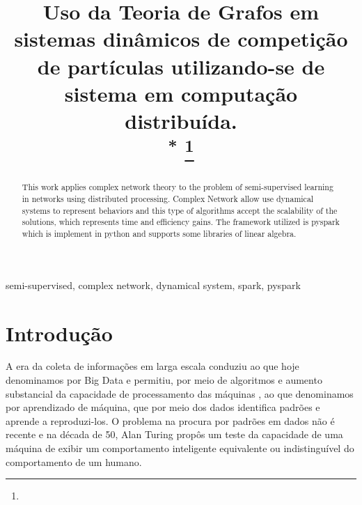 \documentclass[conference]{IEEEtran}
\begin{document}
\title{Uso da Teoria de Grafos em sistemas dinâmicos de competição de partículas utilizando-se de  sistema em computação distribuída.\\
{\footnotesize \textsuperscript{*}}
\thanks{}
}

\author{
\and
{}

}

\maketitle

\begin{abstract}
This work applies complex network theory to the problem of semi-supervised learning in networks using distributed processing. Complex Network allow use dynamical systems to represent behaviors and this type of algorithms accept the scalability of the solutions, which represents time and efficiency gains. The framework utilized is pyspark which is implement in python and supports some libraries of linear algebra.
\end{abstract}

\begin{IEEEkeywords}
semi-supervised, complex network, dynamical system, spark, pyspark
\end{IEEEkeywords}

\section{Introdução}
  A era da coleta de informações  em larga escala conduziu ao que hoje denominamos por Big Data\cite{b11} e permitiu, por meio de algoritmos e aumento substancial da capacidade de processamento das máquinas , ao que denominamos por aprendizado de máquina, que por meio dos dados identifica padrões e aprende a reproduzi-los. O problema na procura por padrões em dados não é recente e na década de 50, Alan Turing propôs um teste da capacidade de uma máquina de exibir um comportamento inteligente equivalente ou indistinguível do comportamento de um humano.
  
\end{document}
